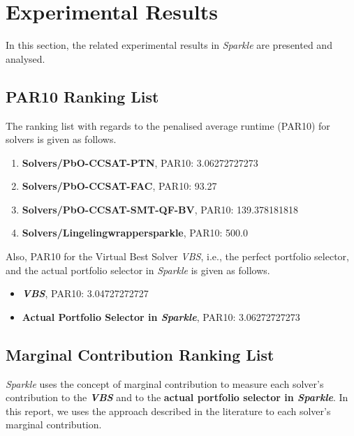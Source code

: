 \documentclass[british]{article}
\begin{document}
\section{Experimental Results}
\label{sec:Experimental_Results}

In this section, the related experimental results in \emph{Sparkle} are presented and analysed.

\subsection{PAR10 Ranking List}
\label{sec:PAR10_Ranking}

The ranking list with regards to the penalised average runtime (PAR10) for solvers is given as follows.

\begin{enumerate}
\item \textbf{Solvers/PbO-CCSAT-PTN}, PAR10: 3.06272727273
\item \textbf{Solvers/PbO-CCSAT-FAC}, PAR10: 93.27
\item \textbf{Solvers/PbO-CCSAT-SMT-QF-BV}, PAR10: 139.378181818
\item \textbf{Solvers/Lingeling\textunderscore wrapper\textunderscore sparkle}, PAR10: 500.0

\end{enumerate}

Also, PAR10 for the Virtual Best Solver \emph{VBS}, i.e., the perfect portfolio selector, and the actual portfolio selector in \emph{Sparkle} is given as follows.

\begin{itemize}
\item \textbf{\emph{VBS}}, PAR10: 3.04727272727
\item \textbf{Actual Portfolio Selector in \emph{Sparkle}}, PAR10: 3.06272727273
\end{itemize}

\subsection{Marginal Contribution Ranking List}
\label{sec:Marginal_Contribution_Ranking}

\emph{Sparkle} uses the concept of marginal contribution \cite{XuEtAl12} to measure each solver's contribution to the \textbf{\emph{VBS}} and to the \textbf{actual portfolio selector in \emph{Sparkle}}. In this report, we uses the approach described in the literature \cite{FreEtAl16} to each solver's marginal contribution.
\end{document}
